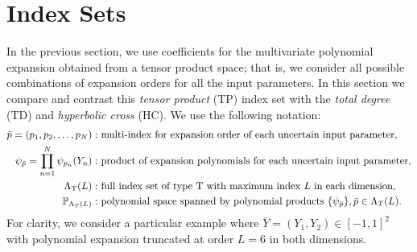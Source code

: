 \section{Index Sets}
In the previous section, we use coefficients for the multivariate polynomial expansion obtained from a tensor product space; that is, we consider all possible combinations of expansion orders for all the input parameters.  In this section we compare and contrast this \textit{tensor product} (TP) index set with the \textit{total degree} (TD) and \textit{hyperbolic cross} (HC).  We use the following notation:
\begin{align}
\bar p=(p_1,p_2,\ldots,p_N):&\text{ multi-index for expansion order of each uncertain input parameter},\\
\psi_{\bar p}=\prod_{n=1}^N\psi_{p_n}(Y_n):&\text{ product of expansion polynomials for each uncertain input parameter},\\
\Lambda_\text{T}(L):&\text{ full index set of type T with maximum index $L$ in each dimension},\\
\mathbb{P}_{\Lambda_T(L)}:&\text{ polynomial space spanned by polynomial products } \qty{\psi_{\bar p}},\bar p\in\Lambda_T(L).
\end{align}
For clarity, we consider a particular example where $\bar Y=(Y_1,Y_2)\in[-1,1]^2$ with polynomial expansion truncated at order $L=6$ in both dimensions.


